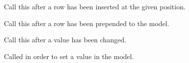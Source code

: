 Call this after a row has been inserted at the given position.

\label{wxdataviewindexlistmodelrowprepended}


Call this after a row has been prepended to the model.

\label{wxdataviewindexlistmodelrowvaluechanged}


Call this after a value has been changed.

\label{wxdataviewindexlistmodelsetvalue}


Called in order to set a value in the model.

